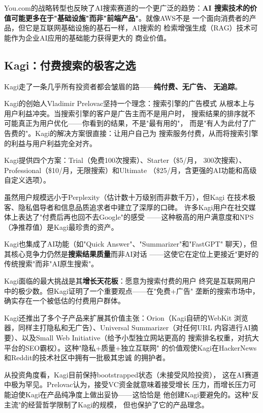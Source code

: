 You.com的战略转型也反映了AI搜索赛道的一个更广泛的趋势：\textbf{AI
搜索技术的价值可能更多在于"基础设施"而非"前端产品"}。就像AWS不是
一个面向消费者的产品，但它是互联网基础设施的基石一样，AI搜索的
检索增强生成（RAG）技术可能作为企业AI应用的基础能力获得更大的
商业价值。

\subsection{Kagi：付费搜索的极客之选}
\label{subsec:kagi}

Kagi走了一条几乎所有投资者都会皱眉的路——\textbf{纯付费、无广告、
无追踪}。

Kagi的创始人Vladimir Prelovac坚持一个理念：搜索引擎的广告模式
从根本上与用户利益冲突。当搜索引擎的客户是广告主而不是用户时，
搜索结果的排序就不可能真正为用户优化——你看到的结果，不是"最有用的"，
而是"有人为此付了广告费的"。Kagi的解决方案很直接：让用户自己为
搜索服务付费，从而将搜索引擎的利益与用户利益完全对齐。

Kagi提供四个方案：Trial（免费100次搜索）、Starter（\$5/月，
300次搜索）、Professional（\$10/月，无限搜索）和Ultimate
（\$25/月，含更强的AI功能和高级自定义选项）。

虽然用户规模远小于Perplexity（估计数十万级别而非数千万），但Kagi
在技术极客、隐私倡导者和信息品质追求者中建立了深厚的口碑。
许多Kagi用户在社交媒体上表达了"付费后再也回不去Google"的感受
——这种极高的用户满意度和NPS（净推荐值）是Kagi最珍贵的资产。

Kagi也集成了AI功能（如"Quick Answer"、"Summarizer"和"FastGPT"
聊天），但其核心竞争力仍然是\textbf{搜索结果质量}而非AI对话
——这使它在定位上更接近"更好的传统搜索"而非"AI原生搜索"。

Kagi面临的最大挑战是其\textbf{增长天花板}：愿意为搜索付费的用户
终究是互联网用户中的极少数。但Kagi证明了一个重要观点——在"免费+广告"
垄断的搜索市场中，确实存在一个被低估的付费用户群体。

Kagi还推出了多个子产品来扩展其价值主张：Orion（Kagi自研的WebKit
浏览器，同样主打隐私和无广告）、Universal Summarizer（对任何URL
内容进行AI摘要）、以及Small Web Initiative（给予小型独立网站更高的
搜索排名权重，对抗大平台的SEO霸权）。这种"隐私+质量+独立互联网"
的价值观使Kagi在HackerNews和Reddit的技术社区中拥有一批极其忠诚
的拥护者。

从投资角度看，Kagi目前保持bootstrapped状态（未接受风险投资），
这在AI赛道中极为罕见。Prelovac认为，接受VC资金就意味着接受增长
压力，而增长压力可能迫使Kagi在产品纯净度上做出妥协——这恰恰是
他创建Kagi要避免的。这种"反主流"的经营哲学限制了Kagi的规模，
但也保护了它的产品理念。

